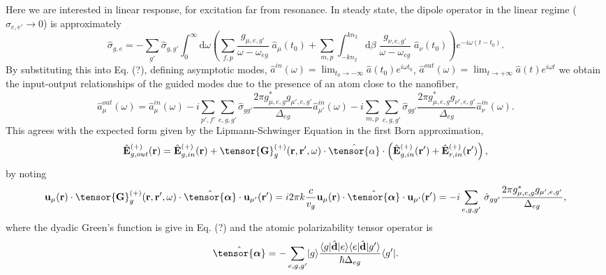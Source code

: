 \documentclass[preprint,aps,pra,onecolumn]{revtex4-1} %
\begin{document}
Here we are interested in linear response, for excitation far from resonance.  In steady state, the dipole 
operator in the linear regime ($\hat{\sigma}_{e,e'} \rightarrow 0 $) is approximately
\begin{equation}
\hat{\sigma}_{g,e} =  -\sum_{g'} \hat{\sigma}_{g,g'}\int_0^{\infty}\mathrm{d}\omega \left(\sum_{f,p}  
\frac{g_{\mu, e,g'}}{\omega-\omega_{eg}}\; \hat{a}_\mu (t_0)+\sum_{m,p}  
\int_{-kn_2}^{kn_2}\mathrm{d}\beta \; \frac{g_{\nu, e,g'}}{\omega-\omega_{eg}} \;\hat{a}_\nu (t_0)  
\right)e^{-i\omega (t-t_0)} .
\end{equation}
By substituting this into Eq. (?), defining asymptotic modes, $\hat{a}^{in}(\omega) = \lim_{t_0\rightarrow 
-\infty} \hat{a}(t_0) e^{i\omega t_0}$, $\hat{a}^{out}(\omega) = \lim_{t\rightarrow +\infty} \hat{a}(t) 
e^{i\omega t}$ we obtain the input-output relationships of the guided modes due to the presence of an 
atom close to the nanofiber,
\begin{equation}
\hat{a}^{out}_\mu (\omega) = \hat{a}^{in}_\mu (\omega) \!-\! i\sum_{p',f'} 
\sum_{e,g,g'}\!\hat{\sigma}_{gg'}\frac{2\pi g_{\mu,e,g}^* 
g_{\mu',e,g'}}{\Delta_{eg}}\hat{a}^{in}_{\mu'}(\omega) \!-\! i\sum_{m,p} 
\sum_{e,g,g'}\!\hat{\sigma}_{gg'}\frac{2\pi  g_{\mu,e,g}^* 
g_{\nu',e,g'}}{\Delta_{eg}}\hat{a}^{in}_{\nu}(\omega).
\end{equation}
This agrees with the expected form given by the Lipmann-Schwinger Equation in the first Born 
approximation,
\begin{equation}
\hat{\mathbf{E}}^{(+)}_{g,out}(\br)=\hat{\mathbf{E}}^{(+)}_{g, 
in}(\br)+\tensor{\mathbf{G}}_g^{(+)}(\br,\br',\omega)\cdot\hat{\tensor{\alpha}}\cdot 
\left(\hat{\mathbf{E}}^{(+)}_{g, in}(\br')+\hat{\mathbf{E}}^{(+)}_{r, in}(\br')\right),
\end{equation}
by noting
\begin{equation}
 \mathbf{u}_{\mu} (\br)\cdot \tensor{\mathbf{G}}_g^{(+)}(\br,\br',\omega)\cdot 
 \hat{\tensor{\boldsymbol{\alpha}}}\cdot \mathbf{u}_{\mu'} (\br') = i 2\pi k\frac{c}{v_g} \mathbf{u}_\mu 
 (\br) \cdot \hat{\tensor{\boldsymbol{\alpha}}}\cdot \mathbf{u}_{\mu'} (\br') = - i \sum_{e,g,g'}\!\ 
 \hat{\sigma}_{gg'} \frac{2\pi g_{\mu,e,g}^* g_{\mu',e,g'}}{\Delta_{eg}},
\end{equation}
where the dyadic Green's function is give in Eq. (?) and the atomic polarizability tensor operator is
\begin{equation}
\hat{\tensor{\boldsymbol{\alpha}}} = -\sum_{e,g,g'}\ket{g}\frac{\bra{g}\hat{\mathbf{d}}\ket{e}\bra{e} 
\hat{\mathbf{d}}\ket{g'}}{\hbar \Delta_{eg}}\bra{g'}.
\end{equation}
\end{document}
